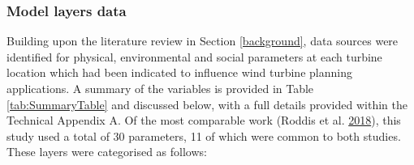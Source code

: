 \documentclass[a4paper,]{article}
\theoremstyle{definition}
\theoremstyle{definition}
\theoremstyle{definition}
\theoremstyle{remark}
\begin{document}
\hypertarget{model-layers-data}{%
\subsubsection{Model layers data}\label{model-layers-data}}

Building upon the literature review in Section \ref{background}, data
sources were identified for physical, environmental and social
parameters at each turbine location which had been indicated to
influence wind turbine planning applications. A summary of the variables
is provided in Table \ref{tab:SummaryTable} and discussed below, with a
full details provided within the Technical Appendix A. Of the most
comparable work (Roddis et al.
\protect\hyperlink{ref-Roddis2018}{2018}), this study used a total of 30
parameters, 11 of which were common to both studies. These layers were
categorised as follows:
\end{document}
